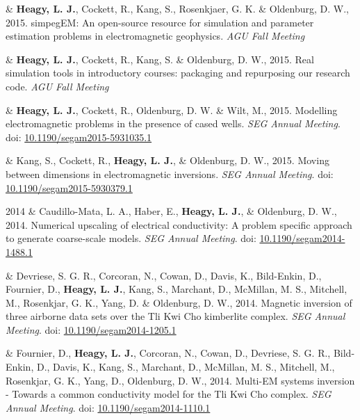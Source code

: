 \documentclass[a4paper, 11pt]{article}
\newcommand{\doi}[1]{doi: \href{https://doi.org/#1}{#1}}
\begin{document}
\begin{entryright}
& \textbf{Heagy, L. J.}, Cockett, R., Kang, S., Rosenkjaer, G. K. \& Oldenburg, D. W., 2015. simpegEM: An open-source resource for simulation and parameter estimation problems in electromagnetic geophysics. \emph{AGU Fall Meeting}
\end{entryright}

\begin{entryright}
& \textbf{Heagy, L. J.}, Cockett, R., Kang, S. \& Oldenburg, D. W., 2015. Real simulation tools in introductory courses: packaging and repurposing our research code. \emph{AGU Fall Meeting}
\end{entryright}

\begin{entryright}
& \textbf{Heagy, L. J.}, Cockett, R., Oldenburg, D. W. \& Wilt, M., 2015. Modelling electromagnetic problems in the presence of cased wells. \emph{SEG Annual Meeting}. \doi{10.1190/segam2015-5931035.1}
\end{entryright}

\begin{entryright}
& Kang, S., Cockett, R., \textbf{Heagy, L. J.}, \& Oldenburg, D. W., 2015. Moving between dimensions in electromagnetic inversions. \emph{SEG Annual Meeting}. \doi{10.1190/segam2015-5930379.1}
\end{entryright}

\begin{entryright}
2014 & Caudillo-Mata, L. A., Haber, E., \textbf{Heagy, L. J.}, \& Oldenburg, D. W., 2014. Numerical upscaling of electrical conductivity: A problem specific approach to generate coarse-scale models. \emph{SEG Annual Meeting}. \doi{10.1190/segam2014-1488.1}
\end{entryright}

\begin{entryright}
& Devriese, S. G. R., Corcoran, N., Cowan, D., Davis, K., Bild-Enkin, D., Fournier, D., \textbf{Heagy, L. J.}, Kang, S., Marchant, D., McMillan, M. S., Mitchell, M., Rosenkjar, G. K., Yang, D. \& Oldenburg, D. W., 2014. Magnetic inversion of three airborne data sets over the Tli Kwi Cho kimberlite complex. \emph{SEG Annual Meeting}. \doi{10.1190/segam2014-1205.1}
\end{entryright}

\begin{entryright}
& Fournier, D., \textbf{Heagy, L. J.}, Corcoran, N., Cowan, D., Devriese, S. G. R., Bild-Enkin, D., Davis, K., Kang, S., Marchant, D., McMillan, M. S., Mitchell, M., Rosenkjar, G. K., Yang, D., Oldenburg, D. W., 2014. Multi-EM systems inversion - Towards a common conductivity model for the Tli Kwi Cho complex. \emph{SEG Annual Meeting}. \doi{10.1190/segam2014-1110.1}
\end{entryright}
\end{document}
